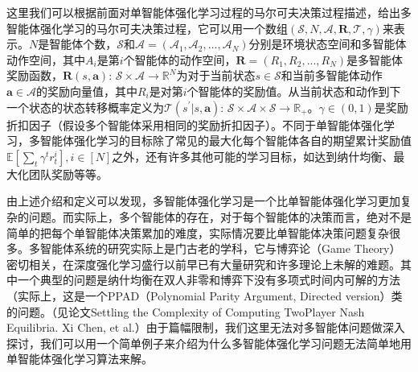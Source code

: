 \documentclass[letterpaper,10pt,english]{sphinxmanual}
\begin{document}
\sphinxAtStartPar
这里我们可以根据前面对单智能体强化学习过程的马尔可夫决策过程描述，给出多智能体强化学习的马尔可夫决策过程，它可以用一个数组\((\mathcal{S}, N, \boldsymbol{\mathcal{A}}, \mathbf{R}, \mathcal{T}, \gamma)\)来表示。\(N\)是智能体个数，\(\mathcal{S}\)和\(\boldsymbol{\mathcal{A}}=(\mathcal{A}_1, \mathcal{A}_2, ..., \mathcal{A}_N)\)分别是环境状态空间和多智能体动作空间，其中\(A_i\)是第\(i\)个智能体的动作空间，\(\mathbf{R}=(R_1, R_2, ..., R_N)\)是多智能体奖励函数，\(\mathbf{R}(s,\mathbf{a})\):
\(\mathcal{S}\times \boldsymbol{\mathcal{A}}\rightarrow \mathbb{R}^N\)为对于当前状态\(s\in\mathcal{S}\)和当前多智能体动作\(\mathbf{a}\in\boldsymbol{\mathcal{A}}\)的奖励向量值，其中\(R_i\)是对第\(i\)个智能体的奖励值。从当前状态和动作到下一个状态的状态转移概率定义为\(\mathcal{T}(s^\prime|s,\mathbf{a})\):
\(\mathcal{S}\times\boldsymbol{\mathcal{A}}\times\mathcal{S}\rightarrow \mathbb{R}_+\)。\(\gamma\in(0,1)\)是奖励折扣因子（假设多个智能体采用相同的奖励折扣因子）。不同于单智能体强化学习，多智能体强化学习的目标除了常见的最大化每个智能体各自的期望累计奖励值\(\mathbb{E}[\sum_t \gamma^t r^i_t], i\in[N]\)之外，还有许多其他可能的学习目标，如达到纳什均衡、最大化团队奖励等等。

\sphinxAtStartPar
由上述介绍和定义可以发现，多智能体强化学习是一个比单智能体强化学习更加复杂的问题。而实际上，多个智能体的存在，对于每个智能体的决策而言，绝对不是简单的把每个单智能体决策累加的难度，实际情况要比单智能体决策问题复杂很多。多智能体系统的研究实际上是门古老的学科，它与博弈论（Game
Theory）密切相关，在深度强化学习盛行以前早已有大量研究和许多理论上未解的难题。其中一个典型的问题是纳什均衡在双人非零和博弈下没有多项式时间内可解的方法（实际上，这是一个PPAD（Polynomial
Parity Argument, Directed version）类的问题。（见论文Settling the
Complexity of Computing Two\sphinxhyphen{}Player Nash Equilibria. Xi Chen, et
al.）由于篇幅限制，我们这里无法对多智能体问题做深入探讨，我们可以用一个简单例子来介绍为什么多智能体强化学习问题无法简单地用单智能体强化学习算法来解。
\end{document}

